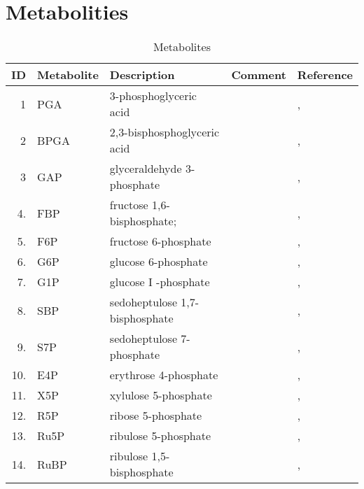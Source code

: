 
\section{Metabolities}
\centering
\begin{table}[H]\footnotesize
	\caption{Metabolites}
	\begin{tabular}{rp{1cm}p{4cm}p{1cm}p{1cm}}
		\hline
		ID & Metabolite & Description & Comment & Reference \\
		\hline
		1 & PGA & 3-phosphoglyceric acid & & \cite{key1},\cite{key2} \\
		2 & BPGA & 2,3-bisphosphoglyceric acid & & \cite{key1},\cite{key2} \\
		3 & GAP & glyceraldehyde  3-phosphate & & \cite{key1},\cite{key2} \\
		4. & FBP & fructose 1,6-bisphosphate; & & \cite{key1},\cite{key2} \\
		5. & F6P & fructose 6-phosphate  & & \cite{key1},\cite{key2} \\
		6. & G6P & glucose 6-phosphate  & & \cite{key1},\cite{key2} \\
		7. & G1P & glucose I -phosphate & & \cite{key1},\cite{key2} \\
		8. & SBP & sedoheptulose 1,7-bisphosphate  & & \cite{key1},\cite{key2} \\
		9. & S7P & sedoheptulose 7-phosphate & & \cite{key1},\cite{key2} \\
		10. & E4P & erythrose 4-phosphate & & \cite{key1},\cite{key2} \\
		11. & X5P & xylulose 5-phosphate & & \cite{key1},\cite{key2} \\
		12. & R5P & ribose 5-phosphate & & \cite{key1},\cite{key2} \\
		13. & Ru5P & ribulose 5-phosphate & & \cite{key1},\cite{key2} \\
		14. & RuBP & ribulose 1,5-bisphosphate & & \cite{key1},\cite{key2} \\
		\hline
	\end{tabular}
\end{table}
\raggedright

